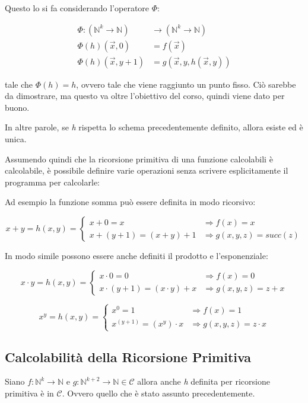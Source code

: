Questo lo si fa considerando l'operatore $\Phi$:

\begin{align*}
	\Phi : (\mathbb{N}^k \rightarrow \mathbb{N}) &\rightarrow (\mathbb{N}^k \rightarrow \mathbb{N}) \\
	\Phi(h)(\vec{x}, 0) &= f(\vec{x}) \\
	\Phi(h)(\vec{x}, y+1) &= g(\vec{x}, y, h(\vec{x},y))
\end{align*}

tale che $\Phi(h) = h$, ovvero tale che viene raggiunto un punto
fisso. Ciò sarebbe da dimostrare, ma questo va oltre l'obiettivo del corso, quindi viene dato per buono.

In altre parole, se \emph{h} rispetta lo schema precedentemente definito, allora esiste ed è unica.

Assumendo quindi che la ricorsione primitiva di una funzione calcolabili
è calcolabile, è possibile definire varie operazioni senza scrivere
esplicitamente il programma per calcolarle:

Ad esempio la funzione somma può essere definita in modo ricorsivo:

$$
	x+y = h(x,y) =\begin{cases}
	x+0 = x &\Rightarrow f(x) = x \\
	x+(y+1) = (x+y) + 1 &\Rightarrow g(x,y,z) = succ(z)
	\end{cases}
$$

In modo simile possono essere anche definiti il prodotto e l'esponenziale:

$$
x \cdot y = h(x,y) =\begin{cases}
x \cdot 0 = 0 &\Rightarrow f(x) = 0 \\
x \cdot (y+1) = (x \cdot y) + x &\Rightarrow g(x,y,z) = z+x
\end{cases}
$$

$$
x^y = h(x,y) =\begin{cases}
x^0 = 1 &\Rightarrow f(x) = 1 \\
x^{(y+1)} = (x^y) \cdot x &\Rightarrow g(x,y,z) = z \cdot x
\end{cases}
$$

\subsection{Calcolabilità della Ricorsione Primitiva}\label{calcolabilituxe0-della-ricorsione-primitiva}

Siano $f:\mathbb{N}^k \rightarrow \mathbb{N}$ e $g:\mathbb{N}^{k+2} \rightarrow \mathbb{N} \in \mathcal{C}$ allora anche \emph{h} definita per
ricorsione primitiva è in $\mathcal{C}$. Ovvero quello che è stato assunto precedentemente.

